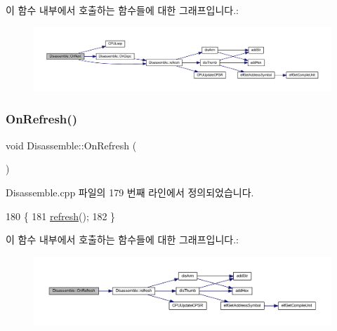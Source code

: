 이 함수 내부에서 호출하는 함수들에 대한 그래프입니다.\+:
\nopagebreak
\begin{figure}[H]
\begin{center}
\leavevmode
\includegraphics[width=350pt]{class_disassemble_a9d25720f4d6c7a31281301b93b0ae02a_cgraph}
\end{center}
\end{figure}
\mbox{\label{class_disassemble_a9b66d72bb746fe9df6bbcb4831dbf8ad}} 
\subsubsection{\texorpdfstring{On\+Refresh()}{OnRefresh()}}
{\footnotesize\ttfamily void Disassemble\+::\+On\+Refresh (\begin{DoxyParamCaption}{ }\end{DoxyParamCaption})\hspace{0.3cm}{\ttfamily [protected]}}



Disassemble.\+cpp 파일의 179 번째 라인에서 정의되었습니다.


\begin{DoxyCode}
180 \{
181   \mbox{\hyperlink{class_disassemble_a7cdf11d53ce0f170ad7dd8fc66961805}{refresh}}();
182 \}
\end{DoxyCode}
이 함수 내부에서 호출하는 함수들에 대한 그래프입니다.\+:
\nopagebreak
\begin{figure}[H]
\begin{center}
\leavevmode
\includegraphics[width=350pt]{class_disassemble_a9b66d72bb746fe9df6bbcb4831dbf8ad_cgraph}
\end{center}
\end{figure}
\mbox{\label{class_disassemble_a480844a650f1a7ab4a396ff1ffdd5655}} 
